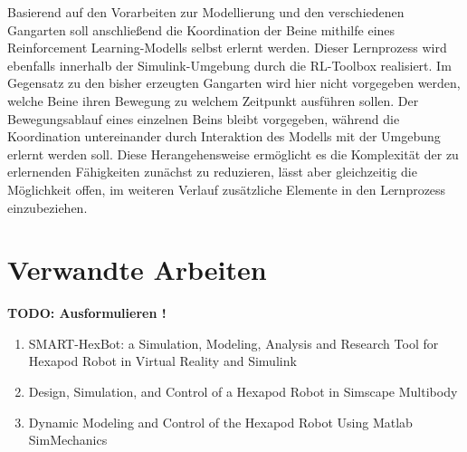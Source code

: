 Basierend auf den Vorarbeiten zur Modellierung und den verschiedenen Gangarten soll anschließend die Koordination der Beine mithilfe eines Reinforcement Learning-Modells selbst erlernt werden.
Dieser Lernprozess wird ebenfalls innerhalb der Simulink-Umgebung durch die RL-Toolbox realisiert.
Im Gegensatz zu den bisher erzeugten Gangarten wird hier nicht vorgegeben werden, welche Beine ihren Bewegung zu welchem Zeitpunkt ausführen sollen.
Der Bewegungsablauf eines einzelnen Beins bleibt vorgegeben, während die Koordination untereinander durch Interaktion des Modells mit der Umgebung erlernt werden soll. 
Diese Herangehensweise ermöglicht es die Komplexität der zu erlernenden Fähigkeiten zunächst zu reduzieren, lässt aber gleichzeitig die Möglichkeit offen, im weiteren Verlauf zusätzliche Elemente in den Lernprozess einzubeziehen.


\section{Verwandte Arbeiten}
\textbf{TODO: Ausformulieren !}
\begin{enumerate}

\item SMART-HexBot: a Simulation, Modeling, Analysis and
Research Tool for Hexapod Robot in Virtual Reality and
Simulink

\item Design, Simulation, and Control of a Hexapod Robot in
Simscape Multibody

\item Dynamic Modeling and Control of the Hexapod Robot Using Matlab SimMechanics

\end{enumerate}


